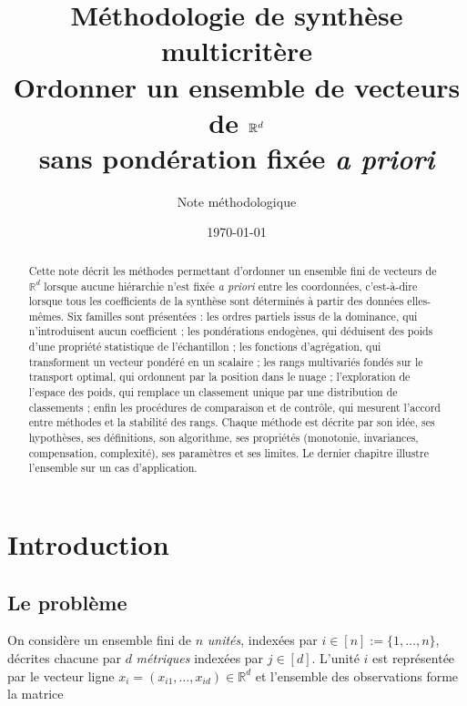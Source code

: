 \documentclass[11pt,a4paper]{article}
\title{\textbf{Méthodologie de synthèse multicritère}\\[0.3em]
\large Ordonner un ensemble de vecteurs de $\R^d$\\ sans pondération fixée \emph{a priori}}
\author{Note méthodologique}
\date{\today}
\theoremstyle{definition}
\theoremstyle{remark}
\newcommand{\R}{\mathbb{R}}
\begin{document}
\maketitle

\begin{abstract}
\noindent
Cette note décrit les méthodes permettant d'ordonner un ensemble fini de vecteurs de
$\R^d$ lorsque aucune hiérarchie n'est fixée \emph{a priori} entre les coordonnées,
c'est-à-dire lorsque tous les coefficients de la synthèse sont déterminés à partir des
données elles-mêmes. Six familles sont présentées : les ordres partiels issus de la
dominance, qui n'introduisent aucun coefficient ; les pondérations endogènes, qui
déduisent des poids d'une propriété statistique de l'échantillon ; les fonctions
d'agrégation, qui transforment un vecteur pondéré en un scalaire ; les rangs
multivariés fondés sur le transport optimal, qui ordonnent par la position dans le
nuage ; l'exploration de l'espace des poids, qui remplace un classement unique par une
distribution de classements ; enfin les procédures de comparaison et de contrôle, qui
mesurent l'accord entre méthodes et la stabilité des rangs. Chaque méthode est décrite
par son idée, ses hypothèses, ses définitions, son algorithme, ses propriétés
(monotonie, invariances, compensation, complexité), ses paramètres et ses limites. Le
dernier chapitre illustre l'ensemble sur un cas d'application.
\end{abstract}

\vspace{0.5em}
{\small\tableofcontents}
\newpage

\section{Introduction}
\label{sec:intro}

\medskip

\subsection{Le problème}

\medskip

On considère un ensemble fini de $n$ \emph{unités}, indexées par $i \in [n] := \{1,\dots,n\}$,
décrites chacune par $d$ \emph{métriques} indexées par $j \in [d]$. L'unité $i$ est
représentée par le vecteur ligne $x_i = (x_{i1},\dots,x_{id}) \in \R^d$ et l'ensemble des
observations forme la matrice
\end{document}
